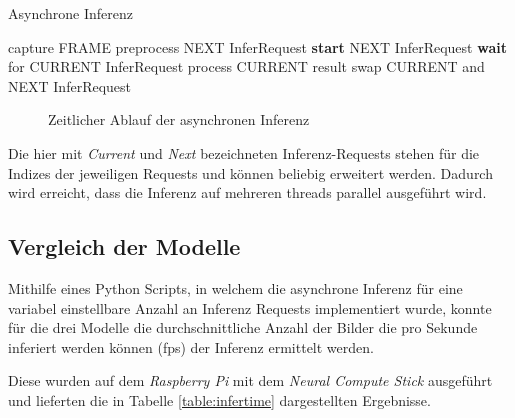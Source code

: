\begin{minipage}{0.1\textwidth}
  \hfill
\end{minipage}
\begin{minipage}{0.5\textwidth}
  \begin{algorithm}[H]
    \caption{Asynchrone Inferenz}
    \label{code:async}
    \begin{algorithmic}
    \WHILE{\TRUE}
        \STATE capture FRAME
        \STATE preprocess NEXT InferRequest
        \STATE \textbf{start} NEXT InferRequest
          \STATE \textbf{wait} for CURRENT InferRequest
          \STATE process CURRENT result
          \STATE swap CURRENT and NEXT InferRequest
    \ENDWHILE
    \end{algorithmic}
  \end{algorithm}
\end{minipage}
\begin{minipage}{0.4\textwidth}
  \centering
  \vspace{1cm}
  \def\svgwidth{0.5\textwidth}
  
\end{minipage}

\vspace{1cm}

\begin{figure}[H]
  \centering
  \def\svgwidth{0.9\textwidth}
  
  \caption{Zeitlicher Ablauf der asynchronen Inferenz}
  \label{fig:async}
\end{figure}

Die hier mit \textit{Current} und \textit{Next} bezeichneten 
Inferenz-Requests stehen für die Indizes der jeweiligen Requests
und können beliebig erweitert werden. 
Dadurch wird erreicht, dass die Inferenz auf mehreren \Glspl{thread} 
parallel ausgeführt wird.


\subsection{Vergleich der Modelle}

Mithilfe eines Python Scripts, in welchem die asynchrone Inferenz 
für eine variabel einstellbare Anzahl an Inferenz Requests
implementiert wurde, konnte für die drei Modelle die 
durchschnittliche Anzahl der Bilder die pro Sekunde inferiert
werden können (\Gls{fps}) der Inferenz ermittelt werden.

Diese wurden auf dem \textit{Raspberry Pi} mit dem \textit{Neural Compute Stick} 
ausgeführt und lieferten die in Tabelle \ref{table:infertime}
dargestellten Ergebnisse.

